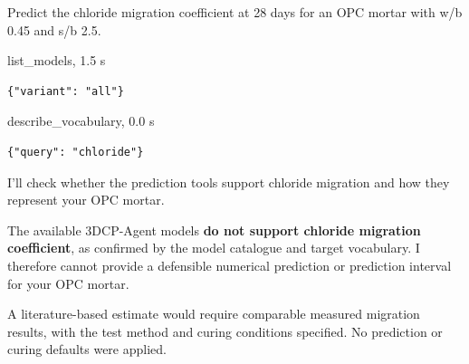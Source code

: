 \begin{userbox}
Predict the chloride migration coefficient at 28 days for an OPC mortar with w/b 0.45 and s/b 2.5.
\end{userbox}
\begin{toolbox}{list\_models, 1.5 s}
\begin{lstlisting}[style=argstyle]
{"variant": "all"}
\end{lstlisting}
\end{toolbox}
\begin{toolbox}{describe\_vocabulary, 0.0 s}
\begin{lstlisting}[style=argstyle]
{"query": "chloride"}
\end{lstlisting}
\end{toolbox}
\begin{agentbox}
I'll check whether the prediction tools support chloride migration and how they represent your OPC mortar.\par
The available 3DCP-Agent models \textbf{do not support chloride migration coefficient}, as confirmed by the model catalogue and target vocabulary. I therefore cannot provide a defensible numerical prediction or prediction interval for your OPC mortar.\par
\par
A literature-based estimate would require comparable measured migration results, with the test method and curing conditions specified. No prediction or curing defaults were applied.\par
\par
\end{agentbox}